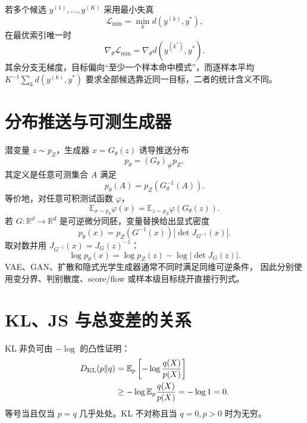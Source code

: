 \documentclass[11pt]{article}
\numberwithin{equation}{section}
\newcommand{\R}{\mathbb{R}}
\newcommand{\E}{\mathbb{E}}
\newcommand{\1}{\mathbf{1}}
\newcommand{\cL}{\mathcal{L}}
\begin{document}
若多个候选 $y^{(1)},\ldots,y^{(K)}$ 采用最小失真
\begin{equation}
 \cL_{\min}=\min_k d(y^{(k)},y^*),
\end{equation}
在最优索引唯一时
\begin{equation}
 \nabla_\theta\cL_{\min}
 =\nabla_\theta d(y^{(k^*)},y^*).
\end{equation}
其余分支无梯度，目标偏向“至少一个样本命中模式”，而逐样本平均
$K^{-1}\sum_kd(y^{(k)},y^*)$ 要求全部候选靠近同一目标，二者的统计含义不同。

\section{分布推送与可测生成器}

潜变量 $z\sim p_Z$，生成器 $x=G_\theta(z)$ 诱导推送分布
\begin{equation}
 p_\theta=(G_\theta)_\#p_Z,
\end{equation}
其定义是任意可测集合 $A$ 满足
\begin{equation}
 p_\theta(A)=p_Z(G_\theta^{-1}(A)).
\end{equation}
等价地，对任意可积测试函数 $\varphi$，
\begin{equation}
 \E_{x\sim p_\theta}\varphi(x)
 =\E_{z\sim p_Z}\varphi(G_\theta(z)).
\end{equation}
若 $G:\R^d\to\R^d$ 是可逆微分同胚，变量替换给出显式密度
\begin{equation}
 p_\theta(x)=p_Z(G^{-1}(x))
 \left|\det J_{G^{-1}}(x)\right|.
\end{equation}
取对数并用 $J_{G^{-1}}(x)=J_G(z)^{-1}$：
\begin{equation}
 \log p_\theta(x)=\log p_Z(z)-\log|\det J_G(z)|.
\end{equation}
VAE、GAN、扩散和隐式光学生成器通常不同时满足同维可逆条件，
因此分别使用变分界、判别散度、score/flow 或样本级目标绕开直接行列式。

\section{KL、JS 与总变差的关系}

KL 非负可由 $-\log$ 的凸性证明：
\begin{align}
 D_{\rm KL}(p\|q)
 &=\E_p\left[-\log\frac{q(X)}{p(X)}\right]\\
 &\ge-\log\E_p\frac{q(X)}{p(X)}=-\log1=0.
\end{align}
等号当且仅当 $p=q$ 几乎处处。KL 不对称且当 $q=0,p>0$ 时为无穷。
\end{document}
